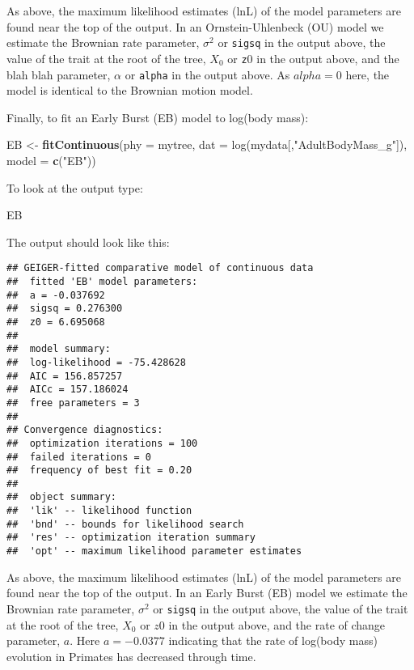 \documentclass[11pt]{article}
\newcommand{\KeywordTok}[1]{\textcolor[rgb]{0.13,0.29,0.53}{\textbf{{#1}}}}
\newcommand{\DataTypeTok}[1]{\textcolor[rgb]{0.13,0.29,0.53}{{#1}}}
\newcommand{\CharTok}[1]{\textcolor[rgb]{0.31,0.60,0.02}{{#1}}}
\newcommand{\StringTok}[1]{\textcolor[rgb]{0.31,0.60,0.02}{{#1}}}
\newcommand{\NormalTok}[1]{{#1}}
\begin{document}
As above, the maximum likelihood estimates (lnL) of the model parameters are found near the top of the output. In an Ornstein-Uhlenbeck (OU) model we estimate the Brownian rate parameter, $\sigma^2$ or \texttt{sigsq} in the output above, the value of the trait at the root of the tree, $X_0$ or \texttt{z$0$} in the output above, and the blah blah parameter, $\alpha$ or \texttt{alpha} in the output above. As $alpha = 0$ here, the model is identical to the Brownian motion model.

Finally, to fit an Early Burst (EB) model to log(body mass):

\begin{snugshade}
\begin{Highlighting}[]
\NormalTok{EB <-}\StringTok{ }\KeywordTok{fitContinuous}\NormalTok{(\DataTypeTok{phy = }mytree, \DataTypeTok{dat = }log(mydata[,"AdultBodyMass_g"]),} 
                    \DataTypeTok{model = }\KeywordTok{c}\NormalTok{(}\StringTok{"}\CharTok{EB}\StringTok{"}\NormalTok{))}
\end{Highlighting}
\end{snugshade}

To look at the output type:

\begin{snugshade}
\begin{Highlighting}[]
\NormalTok{EB}
\end{Highlighting}
\end{snugshade}

The output should look like this:

\begin{verbatim}
## GEIGER-fitted comparative model of continuous data
##  fitted 'EB' model parameters:
##  a = -0.037692
##  sigsq = 0.276300
##  z0 = 6.695068
## 
##  model summary:
##  log-likelihood = -75.428628
##  AIC = 156.857257
##  AICc = 157.186024
##  free parameters = 3
## 
## Convergence diagnostics:
##  optimization iterations = 100
##  failed iterations = 0
##  frequency of best fit = 0.20
## 
##  object summary:
##  'lik' -- likelihood function
##  'bnd' -- bounds for likelihood search
##  'res' -- optimization iteration summary
##  'opt' -- maximum likelihood parameter estimates
\end{verbatim}

As above, the maximum likelihood estimates (lnL) of the model parameters are found near the top of the output. In an Early Burst (EB) model we estimate the Brownian rate parameter, $\sigma^2$ or \texttt{sigsq} in the output above, the value of the trait at the root of the tree, $X_0$ or \texttt{$z0$} in the output above, and the rate of change parameter, $a$. Here $a = -0.0377$ indicating that the rate of log(body mass) evolution in Primates has decreased through time.
\end{document}
